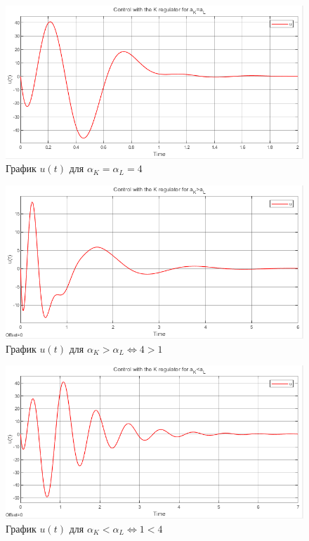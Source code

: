 \documentclass[a4paper, 12pt]{article}
\begin{document}
    \newpage
    \begin{figure}[H]
        \centering
        \includegraphics[scale=0.74]{2task_aK=aL_u.png}
        \captionsetup{skip=0pt}
        \caption{График $u(t)$ для $\alpha_K=\alpha_L=4$}
        \label{2task_aKeqaL_u}
    \end{figure}
    \begin{figure}[H]
        \centering
        \includegraphics[scale=0.74]{2task_aKgaL_u.png}
        \captionsetup{skip=0pt}
        \caption{График $u(t)$ для $\alpha_K>\alpha_L\Leftrightarrow4>1$}
        \label{2task_aKgaL_u}
    \end{figure}
    \begin{figure}[H]
        \centering
        \includegraphics[scale=0.74]{2task_aKlaL_u.png}
        \captionsetup{skip=0pt}
        \caption{График $u(t)$ для $\alpha_K<\alpha_L\Leftrightarrow1<4$}
        \label{2task_aKlaL_u}
    \end{figure}
    
\end{document}
